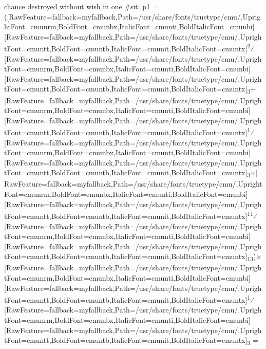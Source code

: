 \begin{myenumerate}
\item{} chance destroyed without wish in one \#sit: p1 = (\allowbreak{}\setmainfont{cmunrm.ttf}[RawFeature={fallback=myfallback},Path=/usr/share/fonts/truetype/cmu/,UprightFont=cmunrm,BoldFont=cmunbx,ItalicFont=cmunti,BoldItalicFont=cmunbi]\setmonofont{cmunrm.ttf}[RawFeature={fallback=myfallback},Path=/usr/share/fonts/truetype/cmu/,UprightFont=cmuntt,BoldFont=cmuntb,ItalicFont=cmunit,BoldItalicFont=cmuntx]\textsuperscript{2}⁄\allowbreak{}\setmainfont{cmunrm.ttf}[RawFeature={fallback=myfallback},Path=/usr/share/fonts/truetype/cmu/,UprightFont=cmunrm,BoldFont=cmunbx,ItalicFont=cmunti,BoldItalicFont=cmunbi]\setmonofont{cmunrm.ttf}[RawFeature={fallback=myfallback},Path=/usr/share/fonts/truetype/cmu/,UprightFont=cmuntt,BoldFont=cmuntb,ItalicFont=cmunit,BoldItalicFont=cmuntx]\textsubscript{3}+\allowbreak{}\setmainfont{cmunrm.ttf}[RawFeature={fallback=myfallback},Path=/usr/share/fonts/truetype/cmu/,UprightFont=cmunrm,BoldFont=cmunbx,ItalicFont=cmunti,BoldItalicFont=cmunbi]\setmonofont{cmunrm.ttf}[RawFeature={fallback=myfallback},Path=/usr/share/fonts/truetype/cmu/,UprightFont=cmuntt,BoldFont=cmuntb,ItalicFont=cmunit,BoldItalicFont=cmuntx]\textsuperscript{1}⁄\allowbreak{}\setmainfont{cmunrm.ttf}[RawFeature={fallback=myfallback},Path=/usr/share/fonts/truetype/cmu/,UprightFont=cmunrm,BoldFont=cmunbx,ItalicFont=cmunti,BoldItalicFont=cmunbi]\setmonofont{cmunrm.ttf}[RawFeature={fallback=myfallback},Path=/usr/share/fonts/truetype/cmu/,UprightFont=cmuntt,BoldFont=cmuntb,ItalicFont=cmunit,BoldItalicFont=cmuntx]\textsubscript{3}×\allowbreak{}\setmainfont{cmunrm.ttf}[RawFeature={fallback=myfallback},Path=/usr/share/fonts/truetype/cmu/,UprightFont=cmunrm,BoldFont=cmunbx,ItalicFont=cmunti,BoldItalicFont=cmunbi]\setmonofont{cmunrm.ttf}[RawFeature={fallback=myfallback},Path=/usr/share/fonts/truetype/cmu/,UprightFont=cmuntt,BoldFont=cmuntb,ItalicFont=cmunit,BoldItalicFont=cmuntx]\textsuperscript{11}⁄\allowbreak{}\setmainfont{cmunrm.ttf}[RawFeature={fallback=myfallback},Path=/usr/share/fonts/truetype/cmu/,UprightFont=cmunrm,BoldFont=cmunbx,ItalicFont=cmunti,BoldItalicFont=cmunbi]\setmonofont{cmunrm.ttf}[RawFeature={fallback=myfallback},Path=/usr/share/fonts/truetype/cmu/,UprightFont=cmuntt,BoldFont=cmuntb,ItalicFont=cmunit,BoldItalicFont=cmuntx]\textsubscript{13})×\allowbreak{}\setmainfont{cmunrm.ttf}[RawFeature={fallback=myfallback},Path=/usr/share/fonts/truetype/cmu/,UprightFont=cmunrm,BoldFont=cmunbx,ItalicFont=cmunti,BoldItalicFont=cmunbi]\setmonofont{cmunrm.ttf}[RawFeature={fallback=myfallback},Path=/usr/share/fonts/truetype/cmu/,UprightFont=cmuntt,BoldFont=cmuntb,ItalicFont=cmunit,BoldItalicFont=cmuntx]\textsuperscript{1}⁄\allowbreak{}\setmainfont{cmunrm.ttf}[RawFeature={fallback=myfallback},Path=/usr/share/fonts/truetype/cmu/,UprightFont=cmunrm,BoldFont=cmunbx,ItalicFont=cmunti,BoldItalicFont=cmunbi]\setmonofont{cmunrm.ttf}[RawFeature={fallback=myfallback},Path=/usr/share/fonts/truetype/cmu/,UprightFont=cmuntt,BoldFont=cmuntb,ItalicFont=cmunit,BoldItalicFont=cmuntx]\textsubscript{3} = 
\end{myenumerate}
